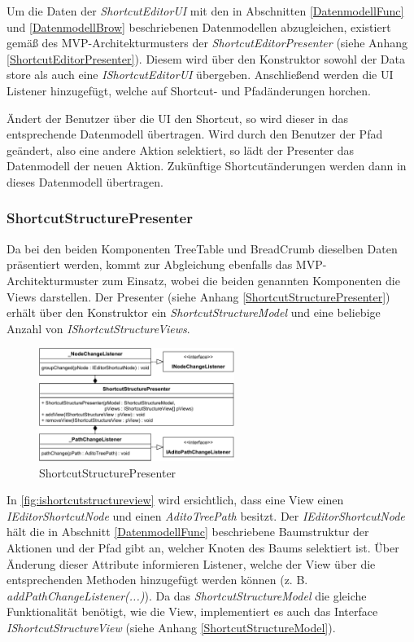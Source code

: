 Um die Daten der \emph{ShortcutEditorUI} mit den in Abschnitten \ref{DatenmodellFunc} und \ref{DatenmodellBrow} beschriebenen Datenmodellen abzugleichen, existiert gemäß des MVP-Architekturmusters der \emph{ShortcutEditorPresenter} (siehe Anhang \ref{ShortcutEditorPresenter}). Diesem wird über den Konstruktor sowohl der Data store als auch eine \emph{IShortcutEditorUI} übergeben. Anschließend werden die UI Listener hinzugefügt, welche auf Shortcut- und Pfadänderungen horchen.

Ändert der Benutzer über die UI den Shortcut, so wird dieser in das entsprechende Datenmodell übertragen. Wird durch den Benutzer der Pfad geändert, also eine andere Aktion selektiert, so lädt der Presenter das Datenmodell der neuen Aktion. Zukünftige Shortcutänderungen werden dann in dieses Datenmodell übertragen.

\subsubsection{ShortcutStructurePresenter}

Da bei den beiden Komponenten TreeTable und BreadCrumb dieselben Daten präsentiert werden, kommt zur Abgleichung ebenfalls das MVP-Architekturmuster zum Einsatz, wobei die beiden genannten Komponenten die Views darstellen. Der Presenter (siehe Anhang \ref{ShortcutStructurePresenter}) erhält über den Konstruktor ein \emph{ShortcutStructureModel} und eine beliebige Anzahl von \emph{IShortcutStructureViews}.

\begin{figure}
	\vspace{-12px}
	\centering
	\includegraphics[width=240px]{../graphic/diagrams/CD_ShortcutStructurePresenter/ShortcutStructurePresenter}
	\caption{ShortcutStructurePresenter}
	\label{fig:shortcutstructurepresenter}
\end{figure}

In \autoref{fig:ishortcutstructureview} wird ersichtlich, dass eine View einen \emph{IEditorShortcutNode} und einen \emph{AditoTreePath} besitzt. Der \emph{IEditorShortcutNode} hält die in Abschnitt \ref{DatenmodellFunc} beschriebene Baumstruktur der Aktionen und der Pfad gibt an, welcher Knoten des Baums selektiert ist. Über Änderung dieser Attribute informieren Listener, welche der View über die entsprechenden Methoden hinzugefügt werden können (z. B. \emph{addPathChangeListener(...)}). Da das \emph{ShortcutStructureModel} die gleiche Funktionalität benötigt, wie die View, implementiert es auch das Interface \emph{IShortcutStructureView} (siehe Anhang \ref{ShortcutStructureModel}).

